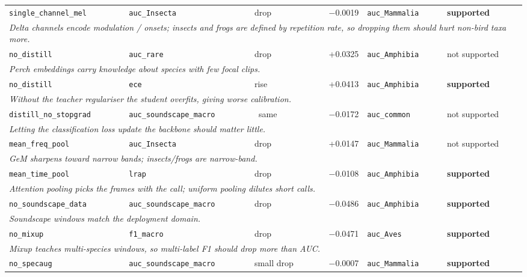 \begin{longtable}{p{3.1cm}p{3.3cm}p{1.4cm}rp{2.9cm}p{1.8cm}}
\texttt{single\_channel\_mel} & \texttt{auc\_Insecta} & drop & $-$0.0019 & \texttt{auc\_Mammalia} & \textbf{supported} \\
\multicolumn{6}{p{15cm}}{\emph{Delta channels encode modulation / onsets; insects and frogs are defined by repetition rate, so dropping them should hurt non-bird taxa more.}} \\[2pt]
\texttt{no\_distill} & \texttt{auc\_rare} & drop & +0.0325 & \texttt{auc\_Amphibia} & not supported \\
\multicolumn{6}{p{15cm}}{\emph{Perch embeddings carry knowledge about species with few focal clips.}} \\[2pt]
\texttt{no\_distill} & \texttt{ece} & rise & +0.0413 & \texttt{auc\_Amphibia} & \textbf{supported} \\
\multicolumn{6}{p{15cm}}{\emph{Without the teacher regulariser the student overfits, giving worse calibration.}} \\[2pt]
\texttt{distill\_no\_stopgrad} & \texttt{auc\_soundscape\_macro} & ~same & $-$0.0172 & \texttt{auc\_common} & not supported \\
\multicolumn{6}{p{15cm}}{\emph{Letting the classification loss update the backbone should matter little.}} \\[2pt]
\texttt{mean\_freq\_pool} & \texttt{auc\_Insecta} & drop & +0.0147 & \texttt{auc\_Mammalia} & not supported \\
\multicolumn{6}{p{15cm}}{\emph{GeM sharpens toward narrow bands; insects/frogs are narrow-band.}} \\[2pt]
\texttt{mean\_time\_pool} & \texttt{lrap} & drop & $-$0.0108 & \texttt{auc\_Amphibia} & \textbf{supported} \\
\multicolumn{6}{p{15cm}}{\emph{Attention pooling picks the frames with the call; uniform pooling dilutes short calls.}} \\[2pt]
\texttt{no\_soundscape\_data} & \texttt{auc\_soundscape\_macro} & drop & $-$0.0486 & \texttt{auc\_Amphibia} & \textbf{supported} \\
\multicolumn{6}{p{15cm}}{\emph{Soundscape windows match the deployment domain.}} \\[2pt]
\texttt{no\_mixup} & \texttt{f1\_macro} & drop & $-$0.0471 & \texttt{auc\_Aves} & \textbf{supported} \\
\multicolumn{6}{p{15cm}}{\emph{Mixup teaches multi-species windows, so multi-label F1 should drop more than AUC.}} \\[2pt]
\texttt{no\_specaug} & \texttt{auc\_soundscape\_macro} & small drop & $-$0.0007 & \texttt{auc\_Mammalia} & \textbf{supported} \\

\end{longtable}
